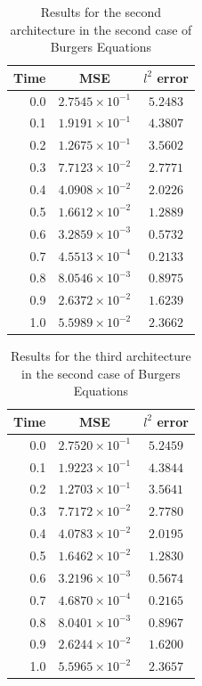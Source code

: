 \documentclass[12pt,letterpaper]{article}
\begin{document}
  \begin{table}[H]
    \begin{center}
    \begin{tabular}{ r | c  c }
    \textbf{Time} & \textbf{MSE} & \textbf{$l^2$ error} \\ \hline
    0.0 & $ 2.7545\times 10^{-1}$ & $ 5.2483 $ \\
    0.1 & $ 1.9191\times 10^{-1}$ & $ 4.3807 $ \\
    0.2 & $ 1.2675\times 10^{-1}$ & $ 3.5602 $ \\
    0.3 & $ 7.7123\times 10^{-2}$ & $ 2.7771 $ \\
    0.4 & $ 4.0908\times 10^{-2}$ & $ 2.0226 $ \\
    0.5 & $ 1.6612\times 10^{-2}$ & $ 1.2889 $ \\
    0.6 & $ 3.2859\times 10^{-3}$ & $ 0.5732 $ \\
    0.7 & $ 4.5513\times 10^{-4}$ & $ 0.2133 $ \\
    0.8 & $ 8.0546\times 10^{-3}$ & $ 0.8975 $ \\
    0.9 & $ 2.6372\times 10^{-2}$ & $ 1.6239 $ \\
    1.0 & $ 5.5989\times 10^{-2}$ & $ 2.3662 $ \\
    \end{tabular}
    \caption{Results for the second architecture in the second case of Burgers Equations}
    \label{tab:B22}
    \end{center}

    \end{table}
    \begin{table}[H]
      \begin{center}
      \begin{tabular}{ r | c  c }
      \textbf{Time} & \textbf{MSE} & \textbf{$l^2$ error} \\ \hline
      0.0 & $ 2.7520\times 10^{-1}$ & $ 5.2459 $ \\
      0.1 & $ 1.9223\times 10^{-1}$ & $ 4.3844 $ \\
      0.2 & $ 1.2703\times 10^{-1}$ & $ 3.5641 $ \\
      0.3 & $ 7.7172\times 10^{-2}$ & $ 2.7780 $ \\
      0.4 & $ 4.0783\times 10^{-2}$ & $ 2.0195 $ \\
      0.5 & $ 1.6462\times 10^{-2}$ & $ 1.2830 $ \\
      0.6 & $ 3.2196\times 10^{-3}$ & $ 0.5674 $ \\
      0.7 & $ 4.6870\times 10^{-4}$ & $ 0.2165 $ \\
      0.8 & $ 8.0401\times 10^{-3}$ & $ 0.8967 $ \\
      0.9 & $ 2.6244\times 10^{-2}$ & $ 1.6200 $ \\
      1.0 & $ 5.5965\times 10^{-2}$ & $ 2.3657 $ \\
      \end{tabular}
      \caption{Results for the third architecture in the second case of Burgers Equations}
      \label{tab:B23}
      \end{center}
      \end{table}  
\end{document}
